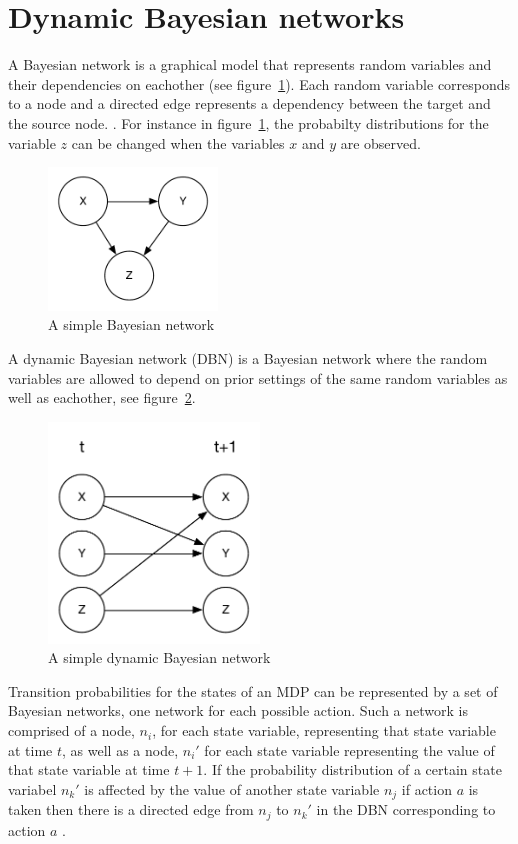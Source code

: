 \section{Dynamic Bayesian networks}

A Bayesian network is a graphical model that represents random variables and
their dependencies on eachother (see figure~\ref{fig:bn}). Each random variable
corresponds to a node and a directed edge represents a dependency between the
target and the source node. \parencite{heckerman1998tutorial}. For instance in
figure~\ref{fig:bn}, the probabilty distributions for the variable $z$ can be
changed when the variables $x$ and $y$ are observed. 

\begin{figure}[H]
\centering
\includegraphics[width=0.4\textwidth]{images/BN.pdf}
\caption{A simple Bayesian network}
\label{fig:bn}
\end{figure}

A dynamic Bayesian network (DBN) is a Bayesian network where the random variables are allowed to depend on prior settings of the same random variables as well as eachother, see figure~\ref{fig:dbn}.

\begin{figure}[H]
    \centering
    \includegraphics[width=0.5\textwidth]{images/DBN.pdf}
    \caption{A simple dynamic Bayesian network}
    \label{fig:dbn}
\end{figure}

Transition probabilities for the states of an MDP can be represented by a set of Bayesian networks, one network for each possible action. Such a network is comprised of a node, $n_i$, for each state variable, representing that state variable at time $t$, as well as a node, $n_i'$ for each state variable representing the value of that state variable at time $t+1$. If the probability distribution of a certain state variabel $n_k'$ is affected by the value of another state variable $n_j$ if action $a$ is taken then there is a directed edge from $n_j$ to $n_k'$ in the DBN corresponding to action $a$ \parencite{guestrin2003efficient}.
